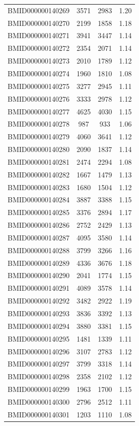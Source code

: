 \documentclass{bmcart}
\begin{document}
\begin{backmatter}
\begin{center}
\begin{longtable}{c|c|c|c}
BMID000000140269 & 3571 & 2983 & 1.20\\
BMID000000140270 & 2199 & 1858 & 1.18 \\
BMID000000140271 & 3941 & 3447 & 1.14 \\
BMID000000140272 & 2354 & 2071 & 1.14 \\
BMID000000140273 & 2010 & 1789 & 1.12 \\
BMID000000140274 & 1960 & 1810 & 1.08 \\
BMID000000140275 & 3277 & 2945 & 1.11 \\
BMID000000140276 & 3333 & 2978 & 1.12 \\
BMID000000140277 & 4625 & 4030 & 1.15 \\
BMID000000140278 & 987 & 933 & 1.06 \\
BMID000000140279 & 4060 & 3641 & 1.12 \\
BMID000000140280 & 2090 & 1837 & 1.14 \\
BMID000000140281 & 2474 & 2294 & 1.08 \\
BMID000000140282 & 1667 & 1479 & 1.13 \\
BMID000000140283 & 1680 & 1504 & 1.12 \\
BMID000000140284 & 3887 & 3388 & 1.15 \\
BMID000000140285 & 3376 & 2894 & 1.17 \\
BMID000000140286 & 2752 & 2429 & 1.13 \\
BMID000000140287 & 4095 & 3580 & 1.14 \\
BMID000000140288 & 3799 & 3266 & 1.16 \\
BMID000000140289 & 4336 & 3676 & 1.18 \\
BMID000000140290 & 2041 & 1774 & 1.15 \\
BMID000000140291 & 4089 & 3578 & 1.14 \\
BMID000000140292 & 3482 & 2922 & 1.19 \\
BMID000000140293 & 3836 & 3392 & 1.13 \\
BMID000000140294 & 3880 & 3381 & 1.15 \\
BMID000000140295 & 1481 & 1339 & 1.11 \\
BMID000000140296 & 3107 & 2783 & 1.12 \\
BMID000000140297 & 3799 & 3318 & 1.14 \\
BMID000000140298 & 2358 & 2102 & 1.12 \\
BMID000000140299 & 1963 & 1700 & 1.15 \\
BMID000000140300 & 2796 & 2512 & 1.11 \\
BMID000000140301 & 1203 & 1110 & 1.08 \\

\end{longtable}
\end{center}
\end{backmatter}
\end{document}
